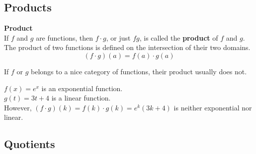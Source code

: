 \documentclass{ximera}
\begin{document}
\subsection*{Products}



\begin{template}  \textbf{\textcolor{blue!55!black}{Product}} \\


If  $f$ and $g$ are functions, then $f \cdot g$, or just $f g$, is called the \textbf{\textcolor{green!50!black}{product}} of $f$ and $g$. \\

The product of two functions is defined on the intersection of their two domains. \\


\[ (f \cdot g)(a) = f(a) \cdot g(a)  \]



\end{template}



\begin{warning}

If $f$ or $g$ belongs to a nice category of functions, their product usually does not.

\end{warning}





\begin{example}

$f(x) = e^x$ is an exponential function. \\
$g(t) = 3 t + 4$ is a linear function. \\

However, $(f \cdot g)(k) = f(k) \cdot g(k) = e^k (3 k + 4)$ is neither exponential nor linear.

\end{example}























\subsection*{Quotients}
\end{document}
